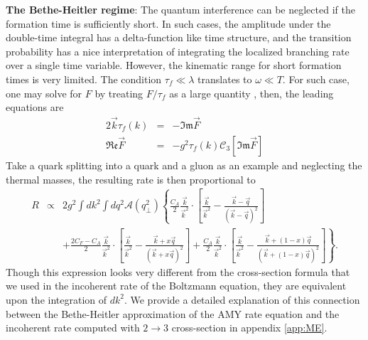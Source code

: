 {\bf The Bethe-Heitler regime}: The quantum interference can be neglected if the formation time is sufficiently short.
In such cases, the amplitude under the double-time integral has a delta-function like time structure, and the transition probability has a nice interpretation of integrating the localized branching rate over a single time variable.
However, the kinematic range for short formation times is very limited. 
The condition $\tau_f \ll \lambda$ translates to $\omega \ll T$.
For such case, one may solve for $F$ by treating $F/\tau_f$ as a large quantity \cite{Ghiglieri:2015ala}, then, the leading equations are
\begin{eqnarray}
2\vec{k}\tau_f(k) &=& - \mathfrak{Im} \vec{F} \\
\mathfrak{Re} \vec{F} &=& -g^2 \tau_f(k)\mathcal{C}_3[\mathfrak{Im} \vec{F}] 
\end{eqnarray}
Take a quark splitting into a quark and a gluon as an example and neglecting the thermal masses, the resulting rate is then proportional to 
\begin{eqnarray}
R &\propto& 2g^2 \int d k^2 \int d q^2 \mathcal{A}(q_\perp^2) \left\{
\frac{C_A}{2} \frac{\vec{k}}{\vec{k}^2}\cdot\left[\frac{\vec{k}}{\vec{k}^2}-\frac{\vec{k}-\vec{q}}{(\vec{k}-\vec{q})^2}\right] \right.\\\nonumber
&&+\left. \frac{2C_F-C_A}{2} \frac{\vec{k}}{\vec{k}^2}\cdot\left[\frac{\vec{k}}{\vec{k}^2}-\frac{\vec{k}+x\vec{q}}{(\vec{k}+x\vec{q})^2}\right]
+\frac{C_A}{2} \frac{\vec{k}}{\vec{k}^2}\cdot\left[\frac{\vec{k}}{\vec{k}^2}-\frac{\vec{k}+(1-x)\vec{q}}{(\vec{k}+(1-x)\vec{q})^2}\right]
\right\}.
\end{eqnarray}
Though this expression looks very different from the cross-section formula that we used in the incoherent rate of the Boltzmann equation, they are equivalent upon the integration of $dk^2$. 
We provide a detailed explanation of this connection between the Bethe-Heitler approximation of the AMY rate equation and the incoherent rate computed with $2\rightarrow 3$ cross-section in appendix \ref{app:ME}.

